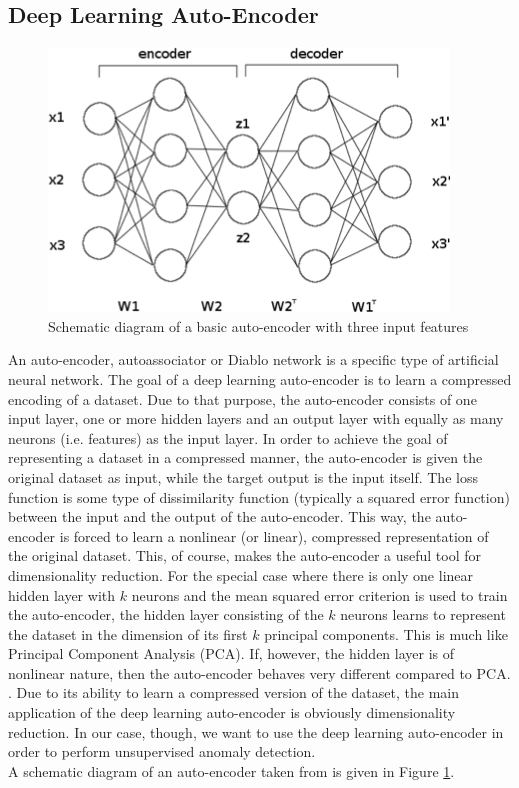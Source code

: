 \documentclass{vldb}
\begin{document}
\subsection{Deep Learning Auto-Encoder}
\label{subsec:Intro-deep}

\begin{figure}
\centering
\includegraphics[width=\linewidth]{"pics/auto-encoder"}
\caption{Schematic diagram of a basic auto-encoder with three input features}
\label{fig:auto-encoder}
\end{figure}

An auto-encoder, autoassociator or Diablo network is a specific type of artificial neural network. The goal of a deep learning auto-encoder is to learn a compressed encoding of a dataset. Due to that purpose, the auto-encoder consists of one input layer, one or more hidden layers and an output layer with equally as many neurons (i.e. features) as the input layer.  In order to achieve the goal of representing a dataset in a compressed manner, the auto-encoder is given the original dataset as input, while the target output is the input itself. \cite{rep:u-montreal} The loss function is some type of dissimilarity function (typically a squared error function) between the input and the output of the auto-encoder. This way, the auto-encoder is forced to learn a nonlinear (or linear), compressed representation of the original dataset. This, of course, makes the auto-encoder a useful tool for dimensionality reduction. For the special case where there is only one linear hidden layer with $k$ neurons and the mean squared error criterion is used to train the auto-encoder, the hidden layer consisting of the $k$ neurons learns to represent the dataset in the dimension of its first $k$ principal components. \cite{rep:u-montreal} This is much like Principal Component Analysis (PCA). If, however, the hidden layer is of nonlinear nature, then the auto-encoder behaves very different compared to PCA. \cite{article:nonlinear-autoassociator}.
Due to its ability to learn a compressed version of the dataset, the main application of the deep learning auto-encoder is obviously dimensionality reduction. In our case, though, we want to use the deep learning auto-encoder in order to perform unsupervised anomaly detection. \\
A schematic diagram of an auto-encoder taken from \cite{article:astronomy} is given in Figure \ref{fig:auto-encoder}. 
\end{document}
